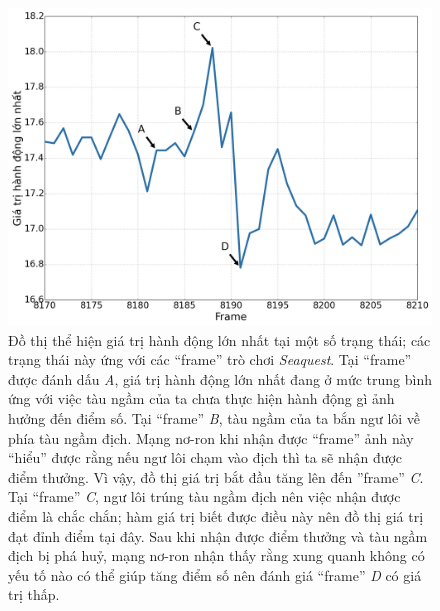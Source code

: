 	\begin{figure}
		\centering
		\includegraphics[width=\textwidth]{dqn_seaquest_frames}
		\caption[Đồ thị giá trị hành động của một số trạng thái trong một lần chơi game]{
		Đồ thị thể hiện giá trị hành động lớn nhất tại một số trạng thái; các trạng thái này ứng với các ``frame'' trò chơi \textit{Seaquest}.
		Tại ``frame'' được đánh dấu \textit{A}, giá trị hành động lớn nhất đang ở mức trung bình ứng với việc tàu ngầm của ta chưa thực hiện hành động gì ảnh hưởng đến điểm số.
		Tại ``frame'' \textit{B}, tàu ngầm của ta bắn ngư lôi về phía tàu ngầm địch.
		Mạng nơ-ron khi nhận được ``frame'' ảnh này ``hiểu'' được rằng nếu ngư lôi chạm vào địch thì ta sẽ nhận được điểm thưởng.
		Vì vậy, đồ thị giá trị bắt đầu tăng lên đến ''frame'' \textit{C}.
		Tại ``frame'' \textit{C}, ngư lôi trúng tàu ngầm địch nên việc nhận được điểm là chắc chắn; hàm giá trị biết được điều này nên đồ thị giá trị đạt đỉnh điểm tại đây.
		Sau khi nhận được điểm thưởng và tàu ngầm địch bị phá huỷ, mạng nơ-ron nhận thấy rằng xung quanh không có yếu tố nào có thể giúp tăng điểm số nên đánh giá ``frame'' \textit{D} có giá trị thấp.		
		}
		\label{fig_seaquest_frames}
	\end{figure}
	
	